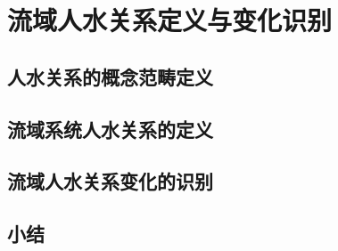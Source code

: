 \chapter{流域人水关系定义与变化识别}\label{ch2:preface}


\section{人水关系的概念范畴定义}\label{ch2:scope}


\section{流域系统人水关系的定义}\label{ch2:definitions}


\section{流域人水关系变化的识别}\label{ch2:dynamic}


\section{小结}\label{ch2:summary}

